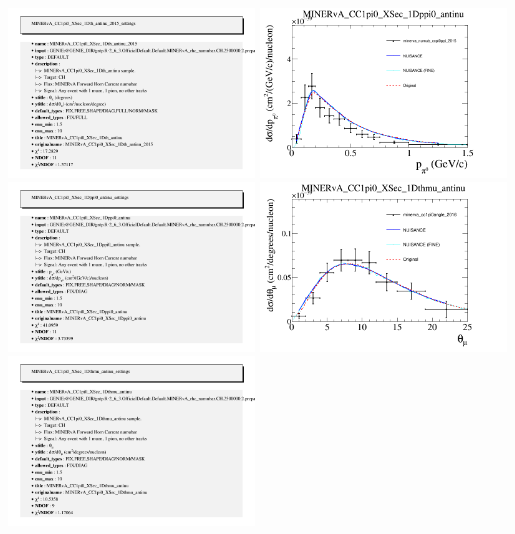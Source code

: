 \documentclass{article}
\begin{document}
\includegraphics[width=0.49\textwidth]{figures/minerva_numub_ccpi0anglepi_2015_info.png}
\centering
\includegraphics[width=0.49\textwidth]{figures/minerva_numub_ccpi0ppi_2015_comp.png}
\includegraphics[width=0.49\textwidth]{figures/minerva_numub_ccpi0ppi_2015_info.png}
\centering
\includegraphics[width=0.49\textwidth]{figures/minerva_cc1pi0angle_2016_comp.png}
\includegraphics[width=0.49\textwidth]{figures/minerva_cc1pi0angle_2016_info.png}
\end{document}
